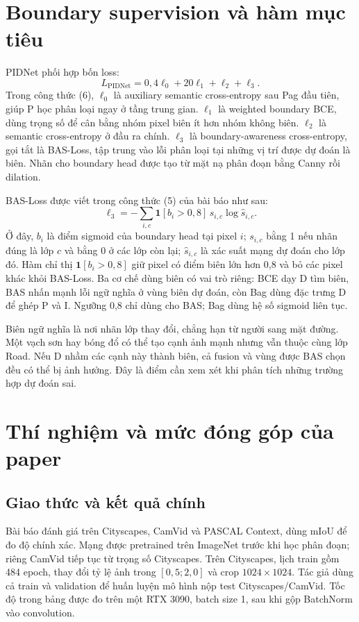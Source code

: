 \section{Boundary supervision và hàm mục tiêu}
PIDNet phối hợp bốn loss:
\begin{equation}
 L_{\mathrm{PIDNet}}=0{,}4\ell_0+20\ell_1+\ell_2+\ell_3.
 \label{eq:pidnet-loss}
\end{equation}
Trong công thức (6), $\ell_0$ là auxiliary semantic cross-entropy sau Pag đầu tiên, giúp P học phân loại ngay ở tầng trung gian. $\ell_1$ là weighted boundary BCE, dùng trọng số để cân bằng nhóm pixel biên ít hơn nhóm không biên. $\ell_2$ là semantic cross-entropy ở đầu ra chính. $\ell_3$ là boundary-awareness cross-entropy, gọi tắt là BAS-Loss, tập trung vào lỗi phân loại tại những vị trí được dự đoán là biên. Nhãn cho boundary head được tạo từ mặt nạ phân đoạn bằng Canny rồi dilation.

BAS-Loss được viết trong công thức (5) của bài báo như sau:
\begin{equation}
 \ell_3=-\sum_{i,c}\mathbf{1}[b_i>0{,}8]\,
                   s_{i,c}\log\hat s_{i,c}.
 \label{eq:bas-loss}
\end{equation}
Ở đây, $b_i$ là điểm sigmoid của boundary head tại pixel $i$; $s_{i,c}$ bằng 1 nếu nhãn đúng là lớp $c$ và bằng 0 ở các lớp còn lại; $\hat s_{i,c}$ là xác suất mạng dự đoán cho lớp đó. Hàm chỉ thị $\mathbf{1}[b_i>0{,}8]$ giữ pixel có điểm biên lớn hơn 0,8 và bỏ các pixel khác khỏi BAS-Loss. Ba cơ chế dùng biên có vai trò riêng: BCE dạy D tìm biên, BAS nhấn mạnh lỗi ngữ nghĩa ở vùng biên dự đoán, còn Bag dùng đặc trưng D để ghép P và I. Ngưỡng 0,8 chỉ dùng cho BAS; Bag dùng hệ số sigmoid liên tục.

Biên ngữ nghĩa là nơi nhãn lớp thay đổi, chẳng hạn từ người sang mặt đường. Một vạch sơn hay bóng đổ có thể tạo cạnh ảnh mạnh nhưng vẫn thuộc cùng lớp Road. Nếu D nhầm các cạnh này thành biên, cả fusion và vùng được BAS chọn đều có thể bị ảnh hưởng. Đây là điểm cần xem xét khi phân tích những trường hợp dự đoán sai.

\section{Thí nghiệm và mức đóng góp của paper}
\subsection{Giao thức và kết quả chính}
Bài báo đánh giá trên Cityscapes, CamVid và PASCAL Context, dùng mIoU để đo độ chính xác. Mạng được pretrained trên ImageNet trước khi học phân đoạn; riêng CamVid tiếp tục từ trọng số Cityscapes. Trên Cityscapes, lịch train gồm 484 epoch, thay đổi tỷ lệ ảnh trong $[0{,}5;2{,}0]$ và crop $1024\times1024$. Tác giả dùng cả train và validation để huấn luyện mô hình nộp test Cityscapes/CamVid. Tốc độ trong bảng được đo trên một RTX 3090, batch size 1, sau khi gộp BatchNorm vào convolution.

